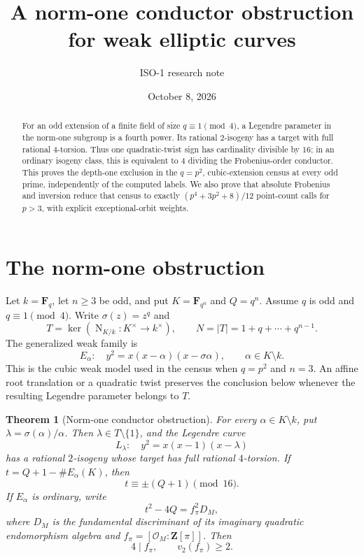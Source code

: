 \documentclass[11pt]{article}
\title{A norm-one conductor obstruction\protect\\for weak elliptic curves}
\author{ISO-1 research note}
\date{October 8, 2026}
\newtheorem{theorem}{Theorem}
\newcommand{\F}{\mathbf F}
\newcommand{\Z}{\mathbf Z}
\newcommand{\OK}{\mathcal O_M}
\newcommand{\Nm}{\operatorname{N}}
\begin{document}
\maketitle
\begin{abstract}
For an odd extension of a finite field of size $q\equiv1\pmod4$, a
Legendre parameter in the norm-one subgroup is a fourth power. Its
rational $2$-isogeny has a target with full rational $4$-torsion. Thus
one quadratic-twist sign has cardinality divisible by $16$; in an
ordinary isogeny class, this is equivalent to $4$ dividing the
Frobenius-order conductor. This proves the depth-one exclusion in the
$q=p^2$, cubic-extension census at every odd prime, independently of
the computed labels. We also prove that absolute Frobenius and inversion
reduce that census to exactly $(p^4+3p^2+8)/12$ point-count calls for
$p>3$, with explicit exceptional-orbit weights.
\end{abstract}

\section{The norm-one obstruction}
Let $k=\F_q$, let $n\ge3$ be odd, and put $K=\F_{q^n}$ and $Q=q^n$.
Assume $q$ is odd and $q\equiv1\pmod4$. Write $\sigma(z)=z^q$ and
\[
 T=\ker(\Nm_{K/k}:K^\times\longrightarrow k^\times),
 \qquad N=|T|=1+q+\cdots+q^{n-1}.
\]
The generalized weak family is
\[
 E_\alpha:\quad y^2=x(x-\alpha)(x-\sigma\alpha),
 \qquad \alpha\in K\setminus k.
\]
This is the cubic weak model used in the census when $q=p^2$ and $n=3$.
An affine root translation or a quadratic twist preserves the conclusion
below whenever the resulting Legendre parameter belongs to $T$.

\begin{theorem}[Norm-one conductor obstruction]\label{thm:main}
For every $\alpha\in K\setminus k$, put
$\lambda=\sigma(\alpha)/\alpha$. Then $\lambda\in T\setminus\{1\}$,
and the Legendre curve
\[
 L_\lambda:\quad y^2=x(x-1)(x-\lambda)
\]
has a rational $2$-isogeny whose target has full rational $4$-torsion.
If $t=Q+1-\#E_\alpha(K)$, then
\begin{equation}\label{eq:trace}
 t\equiv\pm(Q+1)\pmod{16}.
\end{equation}
If $E_\alpha$ is ordinary, write
\[
 t^2-4Q=f_\pi^2D_M,
\]
where $D_M$ is the fundamental discriminant of its imaginary quadratic
endomorphism algebra and $f_\pi=[\OK:\Z[\pi]]$. Then
\begin{equation}\label{eq:conductor}
 4\mid f_\pi,\qquad v_2(f_\pi)\ge2.
\end{equation}
\end{theorem}
\end{document}
